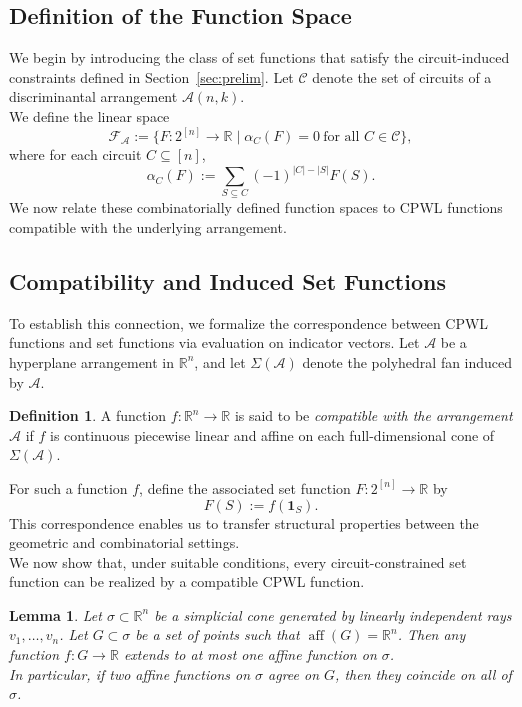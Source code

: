 \documentclass{amsart}
\newtheorem{lemma}[theorem]{Lemma}
\theoremstyle{definition}
\newtheorem{definition}[theorem]{Definition}
\begin{document}
\subsection{Definition of the Function Space}
We begin by introducing the class of set functions that satisfy the circuit-induced constraints defined in Section~\ref{sec:prelim}. Let $\mathcal{C}$ denote the set of circuits of a discriminantal arrangement $\mathcal{A}(n,k)$.\\
\noindent
We define the linear space
\[
\mathcal{F}_{\mathcal{A}} := \{ F : 2^{[n]} \to \mathbb{R} \mid \alpha_C(F) = 0 \ \text{for all } C \in \mathcal{C} \},
\]
where for each circuit $C \subseteq [n]$,
\[
\alpha_C(F) := \sum_{S \subseteq C} (-1)^{|C| - |S|} F(S).
\]
We now relate these combinatorially defined function spaces to CPWL functions compatible with the underlying arrangement.

\subsection{Compatibility and Induced Set Functions}
To establish this connection, we formalize the correspondence between CPWL functions and set functions via evaluation on indicator vectors. Let $\mathcal{A}$ be a hyperplane arrangement in $\mathbb{R}^n$, and let $\Sigma(\mathcal{A})$
denote the polyhedral fan induced by $\mathcal{A}$.
\begin{definition}
A function $f : \mathbb{R}^n \to \mathbb{R}$ is said to be \emph{compatible with the arrangement}
$\mathcal{A}$ if $f$ is continuous piecewise linear and affine on each full-dimensional cone of
$\Sigma(\mathcal{A})$.
\end{definition}
\noindent
For such a function $f$, define the associated set function $F : 2^{[n]} \to \mathbb{R}$ by
\[
F(S) := f(\mathbf{1}_S).
\]
This correspondence enables us to transfer structural properties between the geometric and combinatorial settings.\\
\noindent
We now show that, under suitable conditions, every circuit-constrained set function can be realized by a compatible CPWL function.
\begin{lemma}\label{lem:simplical}
Let $\sigma \subset \mathbb{R}^n$ be a simplicial cone generated by linearly independent rays $v_1,\dots,v_n$. Let $G \subset \sigma$ be a set of points such that $\operatorname{aff}(G) = \mathbb{R}^n$. Then any function $f : G \to \mathbb{R}$ extends to at most one affine function on $\sigma$.\\
\noindent
In particular, if two affine functions on $\sigma$ agree on $G$, then they coincide on all of $\sigma$.
\end{lemma}
\end{document}
